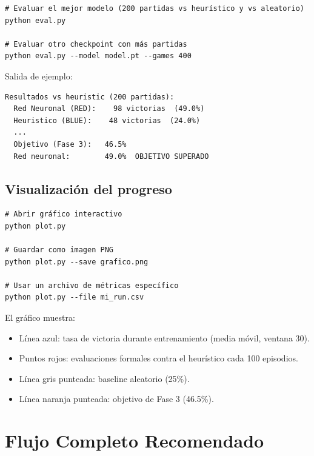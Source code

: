 \documentclass[11pt, a4paper]{article}
\begin{document}
\begin{lstlisting}[style=bash]
# Evaluar el mejor modelo (200 partidas vs heurístico y vs aleatorio)
python eval.py

# Evaluar otro checkpoint con más partidas
python eval.py --model model.pt --games 400
\end{lstlisting}

Salida de ejemplo:
\begin{lstlisting}[style=bash]
Resultados vs heuristic (200 partidas):
  Red Neuronal (RED):    98 victorias  (49.0%)
  Heuristico (BLUE):    48 victorias  (24.0%)
  ...
  Objetivo (Fase 3):   46.5%
  Red neuronal:        49.0%  OBJETIVO SUPERADO
\end{lstlisting}

\subsection{Visualización del progreso}

\begin{lstlisting}[style=bash]
# Abrir gráfico interactivo
python plot.py

# Guardar como imagen PNG
python plot.py --save grafico.png

# Usar un archivo de métricas específico
python plot.py --file mi_run.csv
\end{lstlisting}

El gráfico muestra:
\begin{itemize}[noitemsep]
  \item Línea azul: tasa de victoria durante entrenamiento (media móvil, ventana 30).
  \item Puntos rojos: evaluaciones formales contra el heurístico cada 100 episodios.
  \item Línea gris punteada: baseline aleatorio (25\%).
  \item Línea naranja punteada: objetivo de Fase 3 (46.5\%).
\end{itemize}


\section{Flujo Completo Recomendado}
\end{document}
